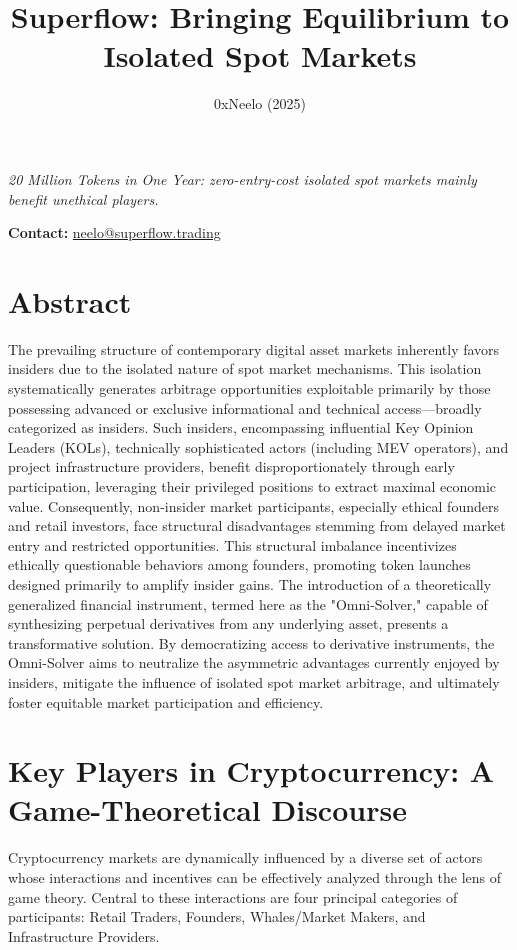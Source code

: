 \documentclass{article}
\title{Superflow: Bringing Equilibrium to Isolated Spot Markets}
\author{0xNeelo (2025)}
\begin{document}

\textit{20 Million Tokens in One Year: zero-entry-cost isolated spot markets mainly benefit unethical players.}

\textbf{Contact:} \url{neelo@superflow.trading}

\section*{Abstract}

The prevailing structure of contemporary digital asset markets inherently favors insiders due to the isolated nature of spot market mechanisms. This isolation systematically generates arbitrage opportunities exploitable primarily by those possessing advanced or exclusive informational and technical access—broadly categorized as insiders. Such insiders, encompassing influential Key Opinion Leaders (KOLs), technically sophisticated actors (including MEV operators), and project infrastructure providers, benefit disproportionately through early participation, leveraging their privileged positions to extract maximal economic value. Consequently, non-insider market participants, especially ethical founders and retail investors, face structural disadvantages stemming from delayed market entry and restricted opportunities. This structural imbalance incentivizes ethically questionable behaviors among founders, promoting token launches designed primarily to amplify insider gains. The introduction of a theoretically generalized financial instrument, termed here as the "Omni-Solver," capable of synthesizing perpetual derivatives from any underlying asset, presents a transformative solution. By democratizing access to derivative instruments, the Omni-Solver aims to neutralize the asymmetric advantages currently enjoyed by insiders, mitigate the influence of isolated spot market arbitrage, and ultimately foster equitable market participation and efficiency.

\section{Key Players in Cryptocurrency: A Game-Theoretical Discourse}

Cryptocurrency markets are dynamically influenced by a diverse set of actors whose interactions and incentives can be effectively analyzed through the lens of game theory. Central to these interactions are four principal categories of participants: Retail Traders, Founders, Whales/Market Makers, and Infrastructure Providers.
\end{document}
